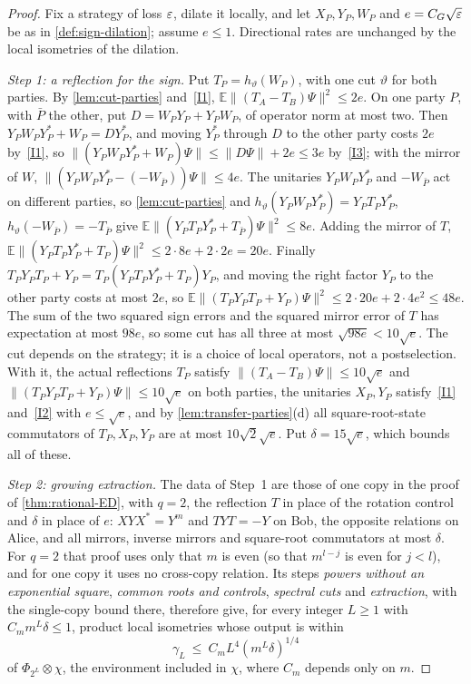 \begin{proof}
Fix a strategy of loss $\varepsilon$, dilate it locally, and let $X_P,Y_P,W_P$ and $e=C_G\sqrt{\varepsilon}$ be as in \cref{def:sign-dilation};
assume $e\le1$. Directional rates are unchanged by the local isometries of the dilation.

\emph{Step 1: a reflection for the sign.} Put $T_P=h_\vartheta(W_P)$, with one cut $\vartheta$ for both parties. By
\cref{lem:cut-parties} and~\ref{I1}, $\mathbb E\|(T_A-T_B)\Psi\|^2\le2e$. On one party $P$, with $\bar P$ the other, put
$D=W_PY_P+Y_PW_P$, of operator norm at most two. Then $Y_PW_PY_P^*+W_P=DY_P^*$, and moving $Y_P^*$ through $D$ to the other
party costs $2e$ by~\ref{I1}, so $\|(Y_PW_PY_P^*+W_P)\Psi\|\le\|D\Psi\|+2e\le3e$ by~\ref{I3}; with the mirror of $W$,
$\|(Y_PW_PY_P^*-(-W_{\bar P}))\Psi\|\le4e$. The unitaries $Y_PW_PY_P^*$ and $-W_{\bar P}$ act on different parties, so
\cref{lem:cut-parties} and $h_\vartheta(Y_PW_PY_P^*)=Y_PT_PY_P^*$, $h_\vartheta(-W_{\bar P})=-T_{\bar P}$ give
$\mathbb E\|(Y_PT_PY_P^*+T_{\bar P})\Psi\|^2\le8e$. Adding the mirror of $T$, $\mathbb E\|(Y_PT_PY_P^*+T_P)\Psi\|^2\le2\cdot8e+2\cdot2e=20e$.
Finally $T_PY_PT_P+Y_P=T_P(Y_PT_PY_P^*+T_P)Y_P$, and moving the right factor $Y_P$ to the other party costs at most $2e$, so
$\mathbb E\|(T_PY_PT_P+Y_P)\Psi\|^2\le2\cdot20e+2\cdot4e^2\le48e$. The sum of the two squared sign errors and the squared mirror
error of $T$ has expectation at most $98e$, so some cut has all three at most $\sqrt{98e}<10\sqrt e$. The cut depends on the
strategy; it is a choice of local operators, not a postselection. With it, the actual reflections $T_P$ satisfy
$\|(T_A-T_B)\Psi\|\le10\sqrt e$ and $\|(T_PY_PT_P+Y_P)\Psi\|\le10\sqrt e$ on both parties, the unitaries $X_P,Y_P$ satisfy~\ref{I1}
and~\ref{I2} with $e\le\sqrt e$, and by \cref{lem:transfer-parties}(d) all square-root-state commutators of $T_P,X_P,Y_P$ are at most
$10\sqrt2\sqrt e$. Put $\delta=15\sqrt e$, which bounds all of these.

\emph{Step 2: growing extraction.} The data of Step~1 are those of one copy in the proof of \cref{thm:rational-ED}, with $q=2$, the
reflection $T$ in place of the rotation control and $\delta$ in place of $e$: $XYX^*=Y^m$ and $TYT=-Y$ on Bob, the opposite relations on
Alice, and all mirrors, inverse mirrors and square-root commutators at most $\delta$. For $q=2$ that proof uses only that $m$ is even
(so that $m^{l-j}$ is even for $j<l$), and for one copy it uses no cross-copy relation. Its steps \emph{powers without an exponential
square}, \emph{common roots and controls}, \emph{spectral cuts} and \emph{extraction}, with the single-copy bound there, therefore
give, for every integer $L\ge1$ with $C_mm^L\delta\le1$,
product local isometries whose output is within
\[
\gamma_L\ \le\ C_mL^4(m^L\delta)^{1/4}
\]
of $\Phi_{2^L}\otimes\chi$, the environment included in $\chi$, where $C_m$ depends only on $m$.


\end{proof}
